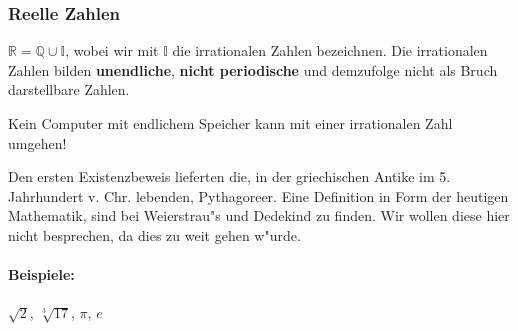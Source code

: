 \subsubsection{Reelle Zahlen}
$\mathbb{R} = \mathbb{Q} \cup \mathbb{I}$, wobei wir mit $\mathbb{I}$ die irrationalen Zahlen bezeichnen. Die irrationalen Zahlen bilden \textbf{unendliche}, \textbf{nicht periodische} und demzufolge nicht als Bruch darstellbare Zahlen. 
\begin{center}
Kein Computer mit endlichem Speicher kann mit einer irrationalen Zahl umgehen!
\end{center}
Den ersten Existenzbeweis lieferten die, in der griechischen Antike im 5. Jahrhundert v. Chr. lebenden, Pythagoreer. Eine Definition in Form der heutigen Mathematik, sind bei Weierstrau"s und Dedekind zu finden. Wir wollen diese hier nicht besprechen, da dies zu weit gehen w"urde.
\paragraph{Beispiele: } $\sqrt{2}$, $\sqrt[3]{17}$, $\pi$, $e$




